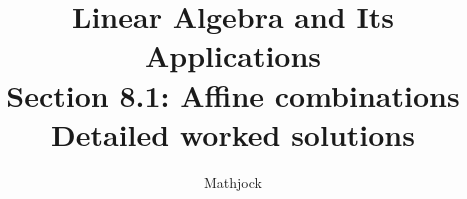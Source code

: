 
\title{\textbf{Linear Algebra and Its Applications}\\[0.3em]Section 8.1: Affine combinations\\[0.3em]\large Detailed worked solutions}
\author{Mathjock}
\date{}

\maketitle
\bookinfo
\tableofcontents
\clearpage
\renewcommand{\thesection}{8.\arabic{section}}
\renewcommand{\theHsection}{8.\arabic{section}}
\setcounter{section}{0}


